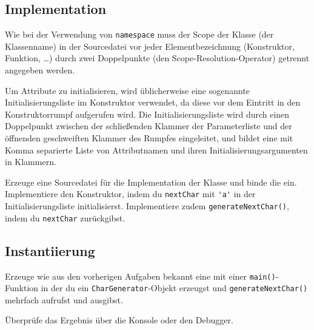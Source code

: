 \subsection{Implementation}
Wie bei der Verwendung von \lstinline{namespace} muss der Scope der Klasse (der Klassenname) in der Sourcedatei vor jeder Elementbezeichnung (Konstruktor, Funktion, \dots) durch zwei Doppelpunkte (den Scope-Resolution-Operator) getrennt angegeben werden.


Um Attribute zu initialisieren, wird üblicherweise eine sogenannte Initialisierungsliste im Konstruktor verwendet, da diese vor dem Eintritt in den Konstruktorrumpf aufgerufen wird.
Die Initialisierungsliste wird durch einen Doppelpunkt zwischen der schließenden Klammer der Parameterliste und der öffnenden geschweiften Klammer des Rumpfes eingeleitet, und bildet eine mit Komma separierte Liste von Attributnamen und ihren Initialisierungsargumenten in Klammern.


Erzeuge eine Sourcedatei  für die Implementation der Klasse und binde die  ein.
Implementiere den Konstruktor, indem du \lstinline{nextChar} mit \lstinline{'a'} in der Initialisierungsliste initialisierst.
Implementiere zudem \lstinline{generateNextChar()}, indem du \lstinline{nextChar} zurückgibst.


\subsection{Instantiierung}
Erzeuge wie aus den vorherigen Aufgaben bekannt eine  mit einer \lstinline{main()}-Funktion in der du ein \lstinline{CharGenerator}-Objekt erzeugst und \lstinline{generateNextChar()} mehrfach aufrufst und ausgibst.


Überprüfe das Ergebnis über die Konsole oder den Debugger.

